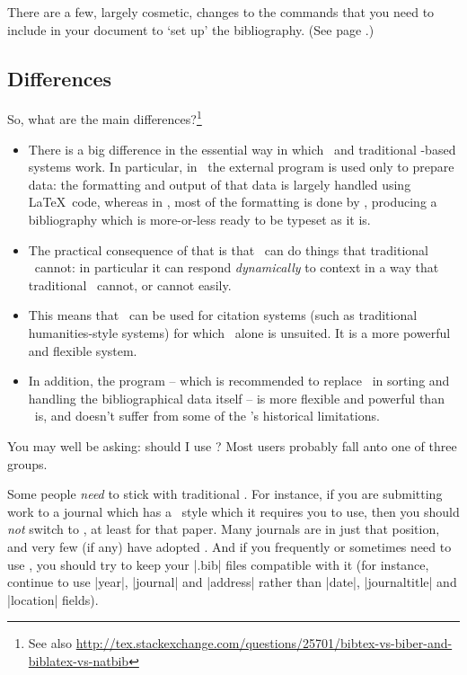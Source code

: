 There are a few, largely cosmetic, changes to the commands that you
need to include in your document to `set up' the bibliography. (See
page \pageref{bibtex:simple:eg}.)

\subsection{Differences}

So, what are the main differences?\footnote{See also \url{http://tex.stackexchange.com/questions/25701/bibtex-vs-biber-and-biblatex-vs-natbib}}
\begin{itemize}
\item There is a big difference in the essential way in which
  \biblatex\ and traditional \bibtex-based systems work. In
  particular, in \biblatex\ the external program is used only to
  prepare data: the formatting and output of that data is largely
  handled using \LaTeX\ code, whereas in \bibtex, most of the
  formatting is done by \bibtex, producing a bibliography which is
  more-or-less ready to be typeset as it is.
\item The practical consequence of that is that \biblatex\ can do
  things that traditional \bibtex\ cannot: in particular it can
  respond \emph{dynamically} to context in a way that traditional
  \bibtex\ cannot, or cannot easily.
\item This means that \biblatex\ can be used for citation systems
  (such as traditional humanities-style systems) for which \bibtex\
  alone is unsuited. It is a more powerful and flexible system.
\item In addition, the  program -- which is recommended
  to replace \bibtex\ in sorting and handling the bibliographical data
  itself -- is more flexible and powerful than \bibtex\ is, and
  doesn't suffer from some of the \bibtex's historical limitations.
\end{itemize}

You may well be asking: should I use \biblatex? Most users probably
fall anto one of three groups.

Some people \emph{need} to stick with traditional \bibtex. For
instance, if you are submitting work to a journal which has a \bibtex\
style which it requires you to use, then you should \emph{not} switch
to \biblatex, at least for that paper. Many journals are in just that
position, and very few (if any) have adopted \biblatex. And if you
frequently or sometimes need to use \bibtex, you should try to keep
your |.bib| files compatible with it (for instance, continue to use
|year|, |journal| and |address| rather than |date|, |journaltitle| and
|location| fields).

